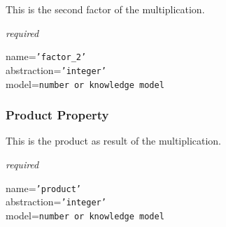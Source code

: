 This is the second factor of the multiplication.

\emph{required}

name=\texttt{'factor\_2'}\\
abstraction=\texttt{'integer'}\\
model=\texttt{number or knowledge model}

\subsubsection{Product Property}

This is the product as result of the multiplication.

\emph{required}

name=\texttt{'product'}\\
abstraction=\texttt{'integer'}\\
model=\texttt{number or knowledge model}
